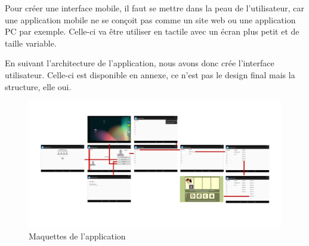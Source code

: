Pour créer une interface mobile, il faut se mettre dans la peau de l'utilisateur, car une application mobile ne se conçoit pas comme un site web ou une application PC par exemple. Celle-ci va être utiliser en tactile avec un écran plus petit et de taille variable.


En suivant l'architecture de l'application, nous avons donc crée l'interface utilisateur. Celle-ci est disponible en annexe, ce n'est pas le design final mais la structure, elle oui.

\begin{figure}[H]
\begin{center}
\includegraphics[width=15cm]{images/pepit_wireframe}
\end{center}
\caption{Maquettes de l'application}
\label{Maquettes de l'application}
\end{figure}